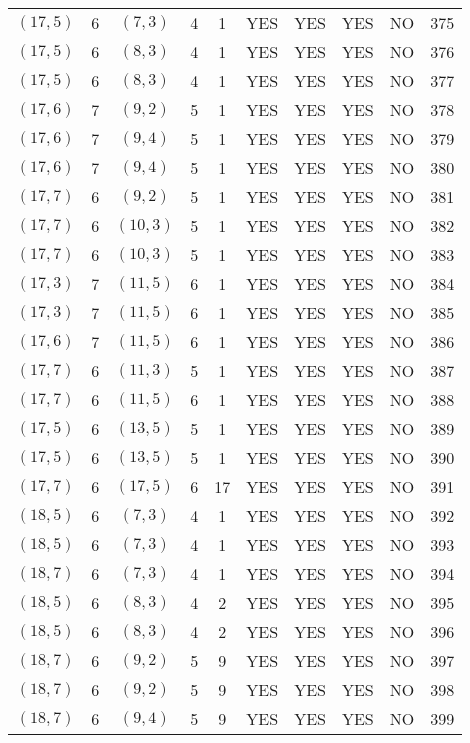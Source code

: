 \begin{longtable}{|c|c|c|c|c|c|c|c|c|c|}
$(17, 5)$ & 6 & $(7, 3)$ & 4 & 1 & YES & YES & YES & NO & 375\\
$(17, 5)$ & 6 & $(8, 3)$ & 4 & 1 & YES & YES & YES & NO & 376\\
$(17, 5)$ & 6 & $(8, 3)$ & 4 & 1 & YES & YES & YES & NO & 377\\
$(17, 6)$ & 7 & $(9, 2)$ & 5 & 1 & YES & YES & YES & NO & 378\\
$(17, 6)$ & 7 & $(9, 4)$ & 5 & 1 & YES & YES & YES & NO & 379\\
$(17, 6)$ & 7 & $(9, 4)$ & 5 & 1 & YES & YES & YES & NO & 380\\
$(17, 7)$ & 6 & $(9, 2)$ & 5 & 1 & YES & YES & YES & NO & 381\\
$(17, 7)$ & 6 & $(10, 3)$ & 5 & 1 & YES & YES & YES & NO & 382\\
$(17, 7)$ & 6 & $(10, 3)$ & 5 & 1 & YES & YES & YES & NO & 383\\
$(17, 3)$ & 7 & $(11, 5)$ & 6 & 1 & YES & YES & YES & NO & 384\\
$(17, 3)$ & 7 & $(11, 5)$ & 6 & 1 & YES & YES & YES & NO & 385\\
$(17, 6)$ & 7 & $(11, 5)$ & 6 & 1 & YES & YES & YES & NO & 386\\
$(17, 7)$ & 6 & $(11, 3)$ & 5 & 1 & YES & YES & YES & NO & 387\\
$(17, 7)$ & 6 & $(11, 5)$ & 6 & 1 & YES & YES & YES & NO & 388\\
$(17, 5)$ & 6 & $(13, 5)$ & 5 & 1 & YES & YES & YES & NO & 389\\
$(17, 5)$ & 6 & $(13, 5)$ & 5 & 1 & YES & YES & YES & NO & 390\\
$(17, 7)$ & 6 & $(17, 5)$ & 6 & 17 & YES & YES & YES & NO & 391\\
$(18, 5)$ & 6 & $(7, 3)$ & 4 & 1 & YES & YES & YES & NO & 392\\
$(18, 5)$ & 6 & $(7, 3)$ & 4 & 1 & YES & YES & YES & NO & 393\\
$(18, 7)$ & 6 & $(7, 3)$ & 4 & 1 & YES & YES & YES & NO & 394\\
$(18, 5)$ & 6 & $(8, 3)$ & 4 & 2 & YES & YES & YES & NO & 395\\
$(18, 5)$ & 6 & $(8, 3)$ & 4 & 2 & YES & YES & YES & NO & 396\\
$(18, 7)$ & 6 & $(9, 2)$ & 5 & 9 & YES & YES & YES & NO & 397\\
$(18, 7)$ & 6 & $(9, 2)$ & 5 & 9 & YES & YES & YES & NO & 398\\
$(18, 7)$ & 6 & $(9, 4)$ & 5 & 9 & YES & YES & YES & NO & 399\\

\end{longtable}
